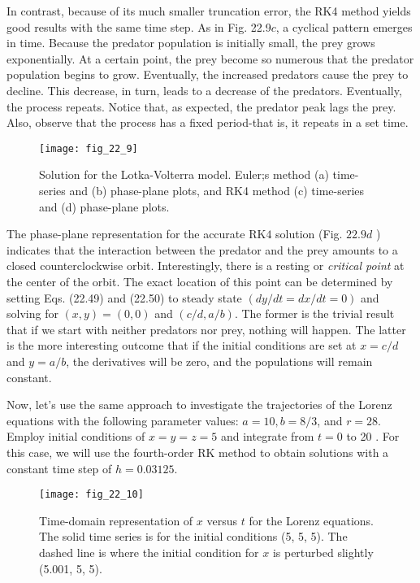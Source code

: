 \documentclass[../main.tex]{subfiles}
\begin{document}
In contrast, because of its much smaller truncation error, the RK4 method yields good results with the same time step. As in Fig. 22.9$c$, a cyclical pattern emerges in time. Because the
predator population is initially small, the prey grows exponentially. At a certain point, the
prey become so numerous that the predator population begins to grow. Eventually, the increased predators cause the prey to decline. This decrease, in turn, leads to a decrease of the
predators. Eventually, the process repeats. Notice that, as expected, the predator peak lags the
prey. Also, observe that the process has a fixed period-that is, it repeats in a set time.

\begin{figure}[H]
    \centering
    \texttt{[image: fig\_22\_9]}
   \caption{\textsf{Solution for the Lotka-Volterra model. Euler;s method (a) time-series and (b) phase-plane plots, and
   RK4 method (c) time-series and (d) phase-plane plots.}}\label{fig:fig_22_9}
\end{figure}

The phase-plane representation for the accurate $\mathrm{RK} 4$ solution (Fig. $22.9 d$ ) indicates that the interaction between the predator and the prey amounts to a closed counterclockwise orbit. Interestingly, there is a resting or \textit{critical point} at the center of the orbit.
The exact location of this point can be determined by setting Eqs. (22.49) and (22.50) to steady state $(d y / d t=d x / d t=0)$ and solving for $(x, y)=(0,0)$ and $(c / d, a / b)$. The former is the trivial result that if we start with neither predators nor prey, nothing will happen. The latter is the more interesting outcome that if the initial conditions are set at $x=c / d$ and $y=a / b$, the derivatives will be zero, and the populations will remain constant.

Now, let's use the same approach to investigate the trajectories of the Lorenz equations with the following parameter values: $a=10, b=8 / 3$, and $r=28$. Employ initial conditions of $x=y=z=5$ and integrate from $t=0$ to 20 . For this case, we will use the fourth-order $\mathrm{RK}$ method to obtain solutions with a constant time step of $h=0.03125$.

\begin{figure}[H]
    \centering
    \texttt{[image: fig\_22\_10]}
   \caption{\textsf{Time-domain representation of $x$ versus $t$ for the Lorenz equations. The solid time series is for the initial conditions (5, 5, 5). The dashed line is where the initial condition for $x$ is perturbed slightly
   (5.001, 5, 5).}}\label{fig:fig_22_10}
\end{figure}
\end{document}
